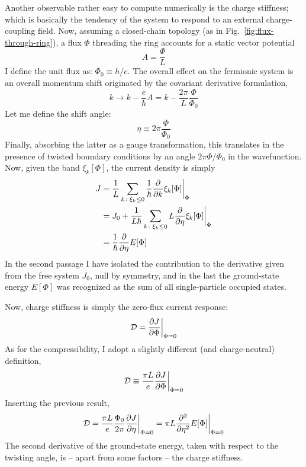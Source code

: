 Another observable rather easy to compute numerically is the charge stiffness; which is basically the tendency of the system to respond to an external charge-coupling field. Now, assuming a closed-chain topology (as in Fig.~\ref{fig:flux-through-ring}), a flux $\Phi$ threading the ring accounts for a static vector potential
\[
	A = \frac{\Phi}{L}
\]
I define the unit flux as:	$\Phi_0 \equiv h/e$. The overall effect on the fermionic system is an overall momentum shift originated by the covariant derivative formulation,
\[
	k \to k - \frac{e}{\hbar} A = k - \frac{2\pi}{L} \frac{\Phi}{\Phi_0}
\]
Let me define the shift angle:
\[
	\eta \equiv 2\pi \frac{\Phi}{\Phi_0}
\]
Finally, absorbing the latter as a gauge transformation, this translates in the presence of twisted boundary conditions by an angle $2\pi \Phi/\Phi_0$ in the wavefunction. Now, given the band $\xi_k[\Phi]$, the current density is simply
\[
	\begin{aligned}
		J &= \frac{1}{L} \sum_{k \colon \xi_k \le 0} \frac{1}{\hbar} \pdv{}{k} \xi_k[\Phi] \bigg|_\Phi \\
		&= J_0 +  \frac{1}{L\hbar} \sum_{k \colon \xi_k \le 0} L \pdv{}{\eta} \xi_k[\Phi] \bigg|_\Phi \\
		&= \frac{1}{\hbar} \pdv{\eta} E[\Phi]
	\end{aligned}
\]
In the second passage I have isolated the contribution to the derivative given from the free system $J_0$, null by symmetry, and in the last the ground-state energy $E[\Phi]$ was recognized as the sum of all single-particle occupied states.

Now, charge stiffness is simply the zero-flux current response:
\[
	\mathcal{D} = \pdv{J}{\Phi} \bigg|_{\Phi=0}
\]
As for the compressibility, I adopt a slightly different (and charge-neutral) definition,
\begin{equation}\label{eq:charge-stiffness-definition}
	\mathcal{D} \equiv \frac{\pi L}{e} \pdv{J}{\Phi} \bigg|_{\Phi=0}
\end{equation}
Inserting the previous result,
\[
	\mathcal{D} = \frac{\pi L}{e} \frac{\Phi_0}{2\pi} \pdv{J}{\eta} \bigg|_{\Phi=0} = \pi L \pdv[2]{\eta} E[\Phi] \bigg|_{\Phi=0}
\]
The second derivative of the ground-state energy, taken with respect to the twisting angle, is -- apart from some factors -- the charge stiffness.

